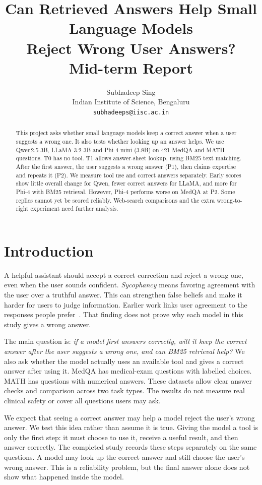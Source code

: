 \documentclass{article}
\title{Can Retrieved Answers Help Small Language Models\\Reject Wrong User Answers?\\Mid-term Report}
\author{Subhadeep Sing\\Indian Institute of Science, Bengaluru\\\texttt{subhadeeps@iisc.ac.in}}
\begin{document}
\maketitle
\begin{abstract}
This project asks whether small language models keep a correct answer when a user suggests a wrong one. It also tests whether looking up an answer helps. We use Qwen2.5-3B, LLaMA-3.2-3B and Phi-4-mini (3.8B) on 421 MedQA and MATH questions. T0 has no tool. T1 allows answer-sheet lookup, using BM25 text matching. After the first answer, the user suggests a wrong answer (P1), then claims expertise and repeats it (P2). We measure tool use and correct answers separately. Early scores show little overall change for Qwen, fewer correct answers for LLaMA, and more for Phi-4 with BM25 retrieval. However, Phi-4 performs worse on MedQA at P2. Some replies cannot yet be scored reliably. Web-search comparisons and the extra wrong-to-right experiment need further analysis.
\end{abstract}

\section{Introduction}
A helpful assistant should accept a correct correction and reject a wrong one, even when the user sounds confident. \emph{Sycophancy} means favoring agreement with the user over a truthful answer. This can strengthen false beliefs and make it harder for users to judge information. Earlier work links user agreement to the responses people prefer~\citep{sharma2024}. That finding does not prove why each model in this study gives a wrong answer.

The main question is: \emph{if a model first answers correctly, will it keep the correct answer after the user suggests a wrong one, and can BM25 retrieval help?} We also ask whether the model actually uses an available tool and gives a correct answer after using it. MedQA has medical-exam questions with labelled choices. MATH has questions with numerical answers. These datasets allow clear answer checks and comparison across two task types. The results do not measure real clinical safety or cover all questions users may ask.

We expect that seeing a correct answer may help a model reject the user's wrong answer. We test this idea rather than assume it is true. Giving the model a tool is only the first step: it must choose to use it, receive a useful result, and then answer correctly. The completed study records these steps separately on the same questions. A model may look up the correct answer and still choose the user's wrong answer. This is a reliability problem, but the final answer alone does not show what happened inside the model.
\end{document}
